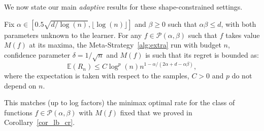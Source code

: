 \documentclass[final,12pt]{colt2018}
\newcommand{\floor}[1]{\lfloor #1 \rfloor}
\begin{document}

We now state our main \emph{adaptive} results for these shape-constrained settings.
\begin{theorem}\label{thm:adap_f_star}
Fix $\alpha \in [0.5\sqrt{d/\log(n)}, \floor{\log(n)}]$ and $\beta \geq 0$ such that $\alpha\beta \leq d$, with both parameters unknown to the learner. For any $f \in \mathcal P(\alpha,\beta)$ such that $f$ takes value $M(f)$ at its maxima, the Meta-Strategy~\ref{alg:extra} run with budget $n$, confidence parameter $\delta= 1/\sqrt{n}$ and $M(f)$ is such that its regret is bounded as:
$$
\mathbb E(R_n) \leq C\log^p(n) n^{1-\alpha/(2\alpha + d - \alpha\beta)},
$$
where the expectation is taken with respect to the samples, $C > 0$ and $p$ do not depend on $n$.
\end{theorem}
This matches (up to log factors) the minimax optimal rate for the class of functions $f \in \mathcal P(\alpha, \beta)$ with $M(f)$ fixed that we proved in Corollary~\ref{cor_lb_cr}.
\end{document}
